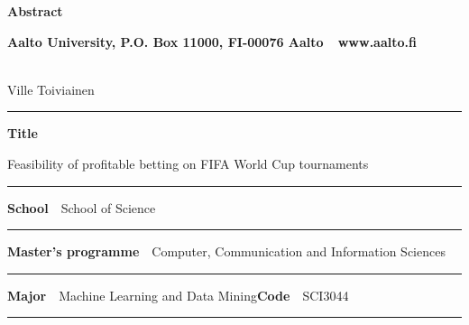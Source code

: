 \newpage
{}
{}


\begin{spacing}{.88}

{\parindent0pt %

{\fontsize{13.9pt}{13.9pt}\selectfont
\vspace{-8.9mm}\hfill{\bfseries\sffamily\lsstyle Abstract}}

{\fontsize{9.48pt}{9.48pt}\selectfont
\vspace{.9mm}\hfill{\bfseries\sffamily\lsstyle Aalto University, P.O. Box 11000, FI-00076 Aalto~~\textcolor{aaltoGray}{www.aalto.fi}}}

\\
{\small Ville Toiviainen}

\vspace{-2.4mm}\rule{\textwidth}{.75pt}

{\fontsize{10.5pt}{10.5pt}\bfseries\sffamily\lsstyle Title}\\
\parbox[t]{\textwidth}{\raggedright\small Feasibility of profitable betting on FIFA World Cup tournaments}

\vspace{.5mm}\rule{\textwidth}{.75pt}

{\fontsize{10.5pt}{10.5pt}\bfseries\sffamily\lsstyle School}~~{\small School of Science}

\vspace{-2.4mm}\rule{\textwidth}{.75pt}

{\fontsize{10.5pt}{10.5pt}\bfseries\sffamily\lsstyle Master's programme}~~{\small Computer, Communication and Information Sciences}

\vspace{-2.4mm}\rule{\textwidth}{.75pt}

{\fontsize{10.5pt}{10.5pt}\bfseries\sffamily\lsstyle Major}~~{\small  Machine Learning and Data Mining}\hfill{\fontsize{10.5pt}{10.5pt}\bfseries\sffamily\lsstyle Code}~~{\small SCI3044}

\vspace{-2.4mm}\rule{\textwidth}{.75pt}

}
\end{spacing}
